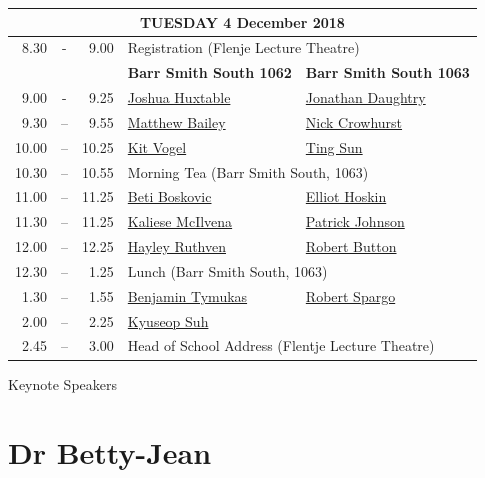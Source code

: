 \documentclass[twoside,14pt,a4paper,notitlepage]{memoir}
\begin{document}
\pagebreak
\vspace*{0cm}
\begin{center}
\begin{tabular}{rcr|p{3.6cm}|p{3.6cm}}
\multicolumn{5}{c}{{\large TUESDAY 4 December 2018}} \\ \hline
8.30 & - & 9.00 & \multicolumn{2}{l}{Registration (Flenje Lecture Theatre)} \\ \hline
 & & & \textbf{Barr Smith South 1062} & \textbf{Barr Smith South 1063} \\ \hline
9.00 & - & 9.25 &
 \hyperref[aut:huxtable]{Joshua Huxtable} &
 \hyperref[aut:daughtry]{Jonathan Daughtry} \\ \hline
9.30 & – & 9.55 &
 \hyperref[aut:bailey]{Matthew Bailey} &
 \hyperref[aut:crowhurst]{Nick Crowhurst} \\ \hline
10.00 & – & 10.25 &
\hyperref[aut:vogel]{Kit Vogel} &
\hyperref[aut:sun]{Ting Sun} \\ \hline
10.30 & – & 10.55 & \multicolumn{2}{l}{Morning Tea (Barr Smith South, 1063)} \\ \hline
11.00 & – & 11.25 & 
 \hyperref[aut:boskovic]{Beti Boskovic} &
 \hyperref[aut:hoskin]{Elliot Hoskin} \\ \hline
11.30 & – & 11.25 &
 \hyperref[aut:mcilvena]{Kaliese McIlvena} &
 \hyperref[aut:johnson]{Patrick Johnson} \\ \hline
12.00 & – & 12.25 &
 \hyperref[aut:ruthven]{Hayley Ruthven} &
 \hyperref[aut:button]{Robert Button} \\ \hline
12.30 & – & 1.25 & \multicolumn{2}{l}{Lunch (Barr Smith South, 1063)} \\ \hline
1.30 & – & 1.55 &
 \hyperref[aut:tymukas]{Benjamin Tymukas} &
 \hyperref[aut:spargo]{Robert Spargo} \\ \hline
2.00 & – & 2.25 & 
\hyperref[aut:suh]{Kyuseop Suh} & \\ \hline
2.45 & – & 3.00 & \multicolumn{2}{l}{Head of School Address (Flentje Lecture Theatre)} \\ \hline
\end{tabular}
\end{center}



\pagebreak
\vspace*{2cm}
{\Huge Keynote Speakers}
\vspace{2cm}

\section*{Dr Betty-Jean}
\end{document}
